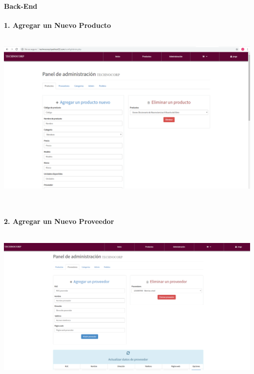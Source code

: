 \begin{flushleft}
\begin{itemize}
\textbf{ }\\
\textbf{ }\\
\textbf{ }\\
\textbf{ }\\
\textbf{ }\\
\textbf{ }\\
\textbf{ }\\
\textbf{ }\\
\textbf{ }\\
\textbf{ }\\
\textbf{ }\\
\textbf{ }\\
\textbf{ }\\
\textbf{ }\\
\textbf{ }\\
\textbf{Back-End}\\
\textbf{ }\\
\textbf{1. Agregar un Nuevo Producto}\\
\textbf{ }\\
\begin{center}
	\includegraphics[width=16cm]{./Imagenes/back} 
\end{center}
\textbf{ }\\
\textbf{ }\\
\textbf{2. Agregar un Nuevo Proveedor }\\
\textbf{ }\\
\begin{center}
	\includegraphics[width=16cm]{./Imagenes/back1} 

\end{center}
\end{itemize}
\end{flushleft}
